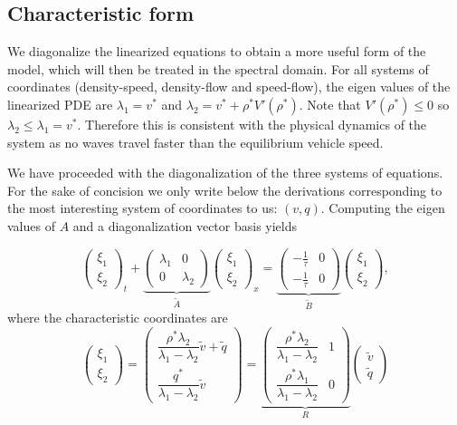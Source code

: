 \documentclass[5p,twocolumn]{elsarticle}
\begin{document}
\subsection{Characteristic form}
We diagonalize the linearized equations to obtain a more useful form of the model, which will then be treated in the spectral domain. 
For all systems of coordinates (density-speed, density-flow and speed-flow), the eigen values of the linearized PDE are $\lambda_1 = v^*$ and $\lambda_2 = v^* + \rho^* V'( \rho^*)$. Note that $V'( \rho^*) \leq 0$ so $\lambda_2 \leq \lambda_1 = v^*$. Therefore this is consistent with the physical dynamics of the system as no waves travel faster than the equilibrium vehicle speed.

We have proceeded with the diagonalization of the three systems of equations. For the sake of concision we only write below the derivations corresponding to the most interesting system of coordinates to us: $\left(v,q\right)$.
Computing the eigen values of $A$ and a diagonalization vector basis yields

\begin{equation} \label{vqlindiag}
\begin{pmatrix}
\xi_1 \\ \xi_2
\end{pmatrix}_t + 
\underset{\tilde{A}}{
	\underbrace{
	\begin{pmatrix}
		\lambda_1 & 0 \\
		0 & \lambda_2
	\end{pmatrix} 
	}
}
\begin{pmatrix}
\xi_1 \\ \xi_2
\end{pmatrix}_x = 
\underset{\tilde{B}}{
	\underbrace{
	\begin{pmatrix}
		-\frac{1}{\tau} & 0 \\
		-\frac{1}{\tau} & 0
	\end{pmatrix}}
}
\begin{pmatrix}
\xi_1 \\ \xi_2
\end{pmatrix},
\end{equation}
where the characteristic coordinates are
\begin{equation} \label{eq:Riemannzeta}
\begin{pmatrix}
\xi_1 \\ \xi_2
\end{pmatrix} = \begin{pmatrix}
\dfrac{\rho^*\lambda_2}{\lambda_1 - \lambda_2}\tilde{v} + \tilde{q} \\ 
\dfrac{q^*}{\lambda_1 - \lambda_2}\tilde{v} 
\end{pmatrix} = 
\underset{R}{
\underbrace{
	\begin{pmatrix}
		\dfrac{\rho^*\lambda_2}{\lambda_1-\lambda_2} & 1\\
		\dfrac{\rho^*\lambda_1}{\lambda_1-\lambda_2} & 0
	\end{pmatrix}
	}
}
\begin{pmatrix}
	\tilde{v} \\ \tilde{q} 
\end{pmatrix}
\end{equation}
\end{document}
